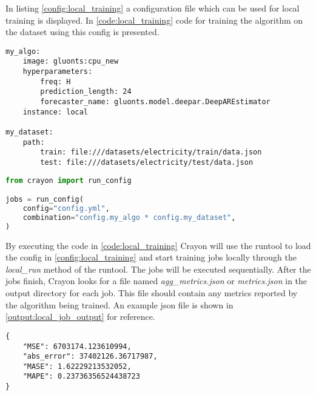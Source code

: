 In listing \ref{config:local_training} a configuration file which can be used for local training is displayed. In \ref{code:local_training} code for training the algorithm on the dataset using this config is presented.

\begin{lstlisting}[label={config:local_training}, caption=Config file for running local training jobs]
my_algo:
    image: gluonts:cpu_new
    hyperparameters:
        freq: H
        prediction_length: 24
        forecaster_name: gluonts.model.deepar.DeepAREstimator
    instance: local

my_dataset:
    path:
        train: file:///datasets/electricity/train/data.json
        test: file:///datasets/electricity/test/data.json
\end{lstlisting}
\begin{lstlisting}[language=Python, label={code:local_training}, caption=Code for running local training jobs using Crayon]
from crayon import run_config

jobs = run_config(
    config="config.yml",
    combination="config.my_algo * config.my_dataset",
)
\end{lstlisting}

By executing the code in \ref{code:local_training} Crayon will use the runtool to load the config in \ref{config:local_training} and start training jobs locally through the \textit{local\_run} method of the runtool. The jobs will be executed sequentially. After the jobs finish, Crayon looks for a file named \textit{agg\_metrics.json} or \textit{metrics.json} in the output directory for each job. This file should contain any metrics reported by the algorithm being trained. An example json file is shown in \ref{output:local_job_output} for reference.

\begin{lstlisting}[label={output:local_job_output}, caption=Example of a training job output file such as \textit{metrics.json} or \textit{agg\_metrics.json}]
{
    "MSE": 6703174.123610994,
    "abs_error": 37402126.36717987,
    "MASE": 1.62229213532052,
    "MAPE": 0.23736356524438723
}
\end{lstlisting}

